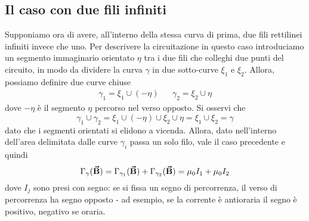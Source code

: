 \subsection{Il caso con due fili infiniti}
Supponiamo ora di avere, all'interno della stessa curva di prima, due fili rettilinei infiniti invece che uno. Per descrivere la circuitazione in questo caso introduciamo un segmento immaginario orientato $\eta$ tra i due fili che colleghi due punti del circuito, in modo da dividere la curva $\gamma$ in due sotto-curve $\xi_1$ e $\xi_2$.
Allora, possiamo definire due curve chiuse
\begin{align*}
	\gamma_1=\xi_1 \cup \left(-\eta\right)&&\gamma_2=\xi_2\cup \eta 
\end{align*} 
dove $-\eta$ è il segmento $\eta$ percorso nel verso opposto. Si osservi che
\begin{equation*}
	\gamma_1\cup\gamma_2=\xi_1\cup \left(-\eta\right)\cup \xi_2\cup \eta=\xi_1\cup \xi_2=\gamma
\end{equation*}
dato che i segmenti orientati si elidono a vicenda. Allora, dato nell'interno dell'area delimitata dalle curve $\gamma_i$ passa un solo filo, vale il caso precedente e quindi 
\begin{equation}
	\Gamma_{\gamma}(\vb*{\va{B}})=\Gamma_{\gamma_1}(\vb*{\va{B}})+\Gamma_{\gamma_2}(\vb*{\va{B}})=\mu_0 I_1+\mu_0I_2
\end{equation}
dove $I_j$ sono presi con segno: se si fissa un segno di percorrenza, il verso di percorrenza ha segno opposto - ad esempio, se la corrente è antioraria il segno è positivo, negativo se oraria.
